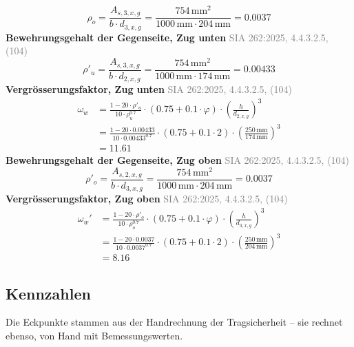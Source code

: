 \documentclass[11pt,a4paper]{article}
\newcommand{\normref}[1]{{\small\textcolor{gray}{#1}}}
\begin{document}
\begin{equation*}
\rho_{o} = \frac{A_{s,3,x,g}}{b \cdot d_{3,x,g}} = \frac{754\,\mathrm{mm}^{2}}{1000\,\mathrm{mm} \cdot 204\,\mathrm{mm}} = 0.0037
\end{equation*}
\noindent\textbf{Bewehrungsgehalt der Gegenseite, Zug unten} \hfill \normref{SIA 262:2025, 4.4.3.2.5, (104)}
\begin{equation*}
\rho'_{u} = \frac{A_{s,3,x,g}}{b \cdot d_{2,x,g}} = \frac{754\,\mathrm{mm}^{2}}{1000\,\mathrm{mm} \cdot 174\,\mathrm{mm}} = 0.00433
\end{equation*}
\noindent\textbf{Vergrösserungsfaktor, Zug unten} \hfill \normref{SIA 262:2025, 4.4.3.2.5, (104)}
\begin{equation*}
\begin{aligned}
  \omega_w &= \frac{1 - 20 \cdot \rho'_{u}}{10 \cdot \rho_{u}^{0.7}} \cdot \left(0.75 + 0.1 \cdot \varphi\right) \cdot \left(\frac{h}{d_{2,x,g}}\right)^{3} \\
  &= \frac{1 - 20 \cdot 0.00433}{10 \cdot 0.00433^{0.7}} \cdot \left(0.75 + 0.1 \cdot 2\right) \cdot \left(\frac{250\,\mathrm{mm}}{174\,\mathrm{mm}}\right)^{3} \\
  &= 11.61
\end{aligned}
\end{equation*}
\noindent\textbf{Bewehrungsgehalt der Gegenseite, Zug oben} \hfill \normref{SIA 262:2025, 4.4.3.2.5, (104)}
\begin{equation*}
\rho'_{o} = \frac{A_{s,2,x,g}}{b \cdot d_{3,x,g}} = \frac{754\,\mathrm{mm}^{2}}{1000\,\mathrm{mm} \cdot 204\,\mathrm{mm}} = 0.0037
\end{equation*}
\noindent\textbf{Vergrösserungsfaktor, Zug oben} \hfill \normref{SIA 262:2025, 4.4.3.2.5, (104)}
\begin{equation*}
\begin{aligned}
  \omega_w' &= \frac{1 - 20 \cdot \rho'_{o}}{10 \cdot \rho_{o}^{0.7}} \cdot \left(0.75 + 0.1 \cdot \varphi\right) \cdot \left(\frac{h}{d_{3,x,g}}\right)^{3} \\
  &= \frac{1 - 20 \cdot 0.0037}{10 \cdot 0.0037^{0.7}} \cdot \left(0.75 + 0.1 \cdot 2\right) \cdot \left(\frac{250\,\mathrm{mm}}{204\,\mathrm{mm}}\right)^{3} \\
  &= 8.16
\end{aligned}
\end{equation*}
\subsection{Kennzahlen}
Die Eckpunkte stammen aus der Handrechnung der Tragsicherheit – sie rechnet ebenso, von Hand mit Bemessungswerten.
\end{document}
